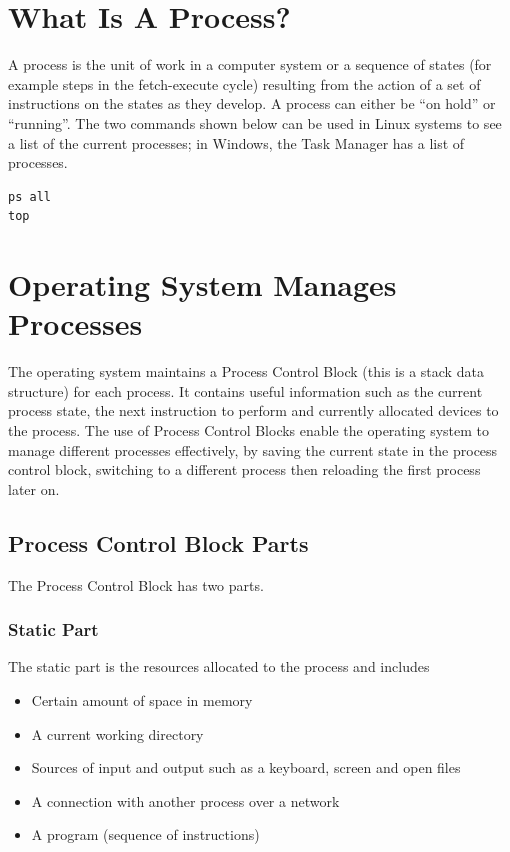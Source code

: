 
\section*{What Is A Process?}
A process is the unit of work in a computer system or a sequence of states (for example steps in the fetch-execute cycle) resulting from the action of a set of instructions on the states as they develop. A process can either be ``on hold'' or ``running''. The two commands shown below can be used in Linux systems to see a list of the current processes; in Windows, the Task Manager has a list of processes.
\begin{verbatim}
ps all
top
\end{verbatim}

\section*{Operating System Manages Processes}
The operating system maintains a Process Control Block (this is a stack data structure) for each process. It contains useful information such as the current process state, the next instruction to perform and currently allocated devices to the process. The use of Process Control Blocks enable the operating system to manage different processes effectively, by saving the current state in the process control block, switching to a different process then reloading the first process later on.

\subsection*{Process Control Block Parts}
The Process Control Block has two parts.
\subsubsection*{Static Part}
The static part is the resources allocated to the process and includes
\begin{itemize}
    \item Certain amount of space in memory
    \item A current working directory
    \item Sources of input and output such as a keyboard, screen and open files
    \item A connection with another process over a network
    \item A program (sequence of instructions)
\end{itemize}
